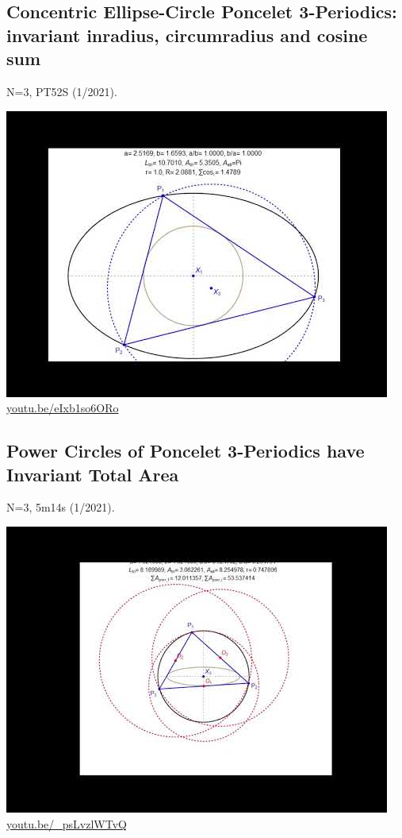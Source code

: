 \documentclass[12pt]{amsart}
\begin{document}
\subsection{Concentric Ellipse-Circle Poncelet 3-Periodics: invariant inradius, circumradius and cosine sum}
\label{vid:eIxb1so6ORo}
\noindent N=3, PT52S (1/2021). 
\begin{center}\includegraphics[width=.5\textwidth]{pics/eIxb1so6ORo.jpg} \\ 
\href{https://youtu.be/eIxb1so6ORo}{\url{youtu.be/eIxb1so6ORo}}\end{center}
% 

\subsection{Power Circles of Poncelet 3-Periodics have Invariant Total Area}
\label{vid:_psLvzlWTvQ}
\noindent N=3, 5m14s (1/2021). 
\begin{center}\includegraphics[width=.5\textwidth]{pics/_psLvzlWTvQ.jpg} \\ 
\href{https://youtu.be/_psLvzlWTvQ}{\url{youtu.be/\_psLvzlWTvQ}}\end{center}
% 
\end{document}

